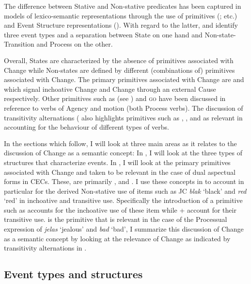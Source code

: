 The difference between Stative and Non-stative predicates has been
captured in models of lexico-semantic representations through the use
of primitives
(\citealt{McCawley1968,Carter1976,Dowty1979,Jackendoff1996}; etc.) and
Event Structure representations (\citealt{Pustejovsky1988,Pustejovsky1991,Grimshaw1990}).  With regard to the latter, \citet{Pustejovsky1988,Pustejovsky1991} and \citet{Grimshaw1990} identify three event types and a
separation between State on one hand and Non-state-Transition and
Process on the other.

Overall, States are characterized by the absence of primitives
associated with Change while Non-states are defined by different
(combinations of) primitives associated with Change.  The primary
primitives associated with Change are \BECOME and \CAUSE which signal
inchoative Change and Change through an external Cause respectively.
Other primitives such as \DO (see \citealt{Dowty1979}) and \textsc{go}
\citep{Jackendoff1996} have been discussed in reference to verbs of
Agency and motion (both Process verbs). The discussion of transitivity
alternations (\citet{Levin1993} also highlights primitives such as
\MOTION, \CONTACT, and \CHANGEOFSTATE as relevant in accounting for the
behaviour of different types of verbs.

In the sections which follow, I will look at three main areas as it
relates to the discussion of Change as a semantic concept: In
, I will look at the three types of structures that
characterize events.  In , I will look at the
primary primitives associated with Change and taken to be relevant in
the case of dual aspectual forms in CECs.  These, are primarily \CAUSE,
\BECOME and \DO.  I use these concepts in  to account in
particular for the derived Non-stative use of items such as JC
\textit{blak} `black' and \textit{red} `red' in inchoative and
transitive use.  Specifically the introduction of a primitive such as
\BECOME accounts for the inchoative use of these item while \BECOME +
\CAUSE account for their transitive use.  \DO is the primitive that is
relevant in the case of the Processual expression of \textit{jelas}
`jealous' and \textit{bad} `bad',  I summarize this discussion of
Change as a semantic concept by looking at the relevance of Change as
indicated by transitivity alternations in .


\subsection{Event types and structures}\label{sec:4.2.1}


